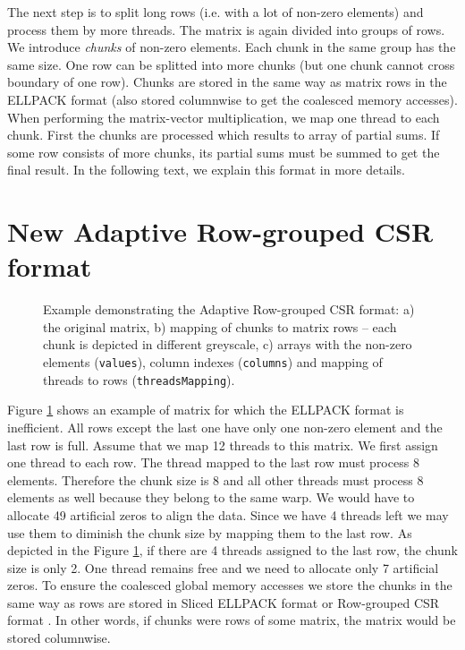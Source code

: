 \documentclass{pj}
\begin{document}
The next step is to split long rows (i.e. with a lot of non-zero elements) and process them by more threads. The matrix is again divided into groups of rows. We introduce {\it chunks} of non-zero elements. Each chunk in the same group has the same size. One row can be splitted into more chunks (but one chunk cannot cross boundary of one row). Chunks are stored in the same way as matrix rows in the ELLPACK format (also stored columnwise to get the coalesced memory accesses). When performing the matrix-vector multiplication, we map one thread to each chunk. First the chunks are processed which results to array of partial sums. If some row consists of more chunks, its partial sums must be summed to get the final result. In the following text, we explain this format in more details.

\section{New Adaptive Row-grouped CSR format}
\label{sect:arg-csr-format}
\begin{figure}[]
\caption{Example demonstrating the Adaptive Row-grouped CSR format: a) the original matrix, b) mapping of chunks to matrix rows -- each chunk is depicted in different greyscale, c) arrays with the non-zero elements ({\tt values}), column indexes ({\tt columns}) and mapping of threads to rows ({\tt threadsMapping}).}
\label{fig:argcsr-1}
\end{figure}
Figure \ref{fig:argcsr-1} shows an example of matrix for which the ELLPACK format is inefficient. All rows except the last one have only one non-zero element and the last row is full. Assume that we map 12 threads to this matrix. We first assign one thread to each row. The thread mapped to the last row must process 8 elements. Therefore the chunk size is 8 and all other threads must process 8 elements as well because they belong to the same warp. We would have to allocate 49 artificial zeros to align the data. Since we have 4 threads left we may use them to diminish the chunk size by mapping them to the last row. As depicted in the Figure \ref{fig:argcsr-1}, if there are 4 threads assigned to the last row, the chunk size is only 2. One thread remains free and we need to allocate only 7 artificial zeros. To ensure the coalesced global memory accesses we store the chunks in the same way as rows are stored in Sliced ELLPACK format \cite{MonakovLokhmotovAvetisyan-2010} or Row-grouped CSR format \cite{OberhuberSuzukiVacata-2011}. In other words, if chunks were rows of some matrix, the matrix would be stored columnwise.
\end{document}
